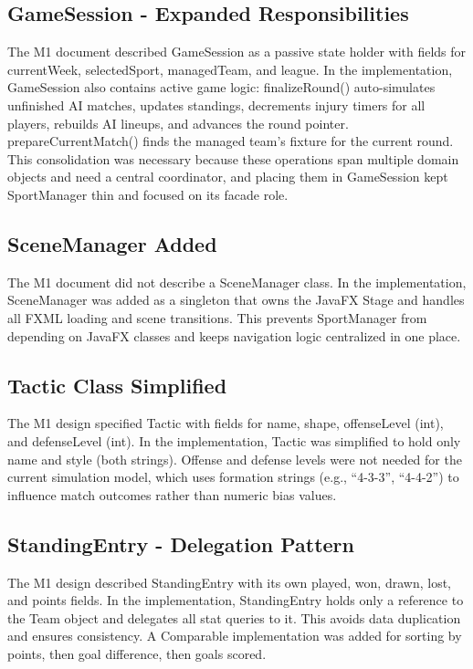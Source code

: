 \documentclass[11pt,a4paper]{article}
\begin{document}
\subsection{GameSession - Expanded Responsibilities}

The M1 document described GameSession as a passive state holder with fields for currentWeek, selectedSport, managedTeam, and league. In the implementation, GameSession also contains active game logic: finalizeRound() auto-simulates unfinished AI matches, updates standings, decrements injury timers for all players, rebuilds AI lineups, and advances the round pointer. prepareCurrentMatch() finds the managed team's fixture for the current round. This consolidation was necessary because these operations span multiple domain objects and need a central coordinator, and placing them in GameSession kept SportManager thin and focused on its facade role.

\subsection{SceneManager Added}

The M1 document did not describe a SceneManager class. In the implementation, SceneManager was added as a singleton that owns the JavaFX Stage and handles all FXML loading and scene transitions. This prevents SportManager from depending on JavaFX classes and keeps navigation logic centralized in one place.

\subsection{Tactic Class Simplified}

The M1 design specified Tactic with fields for name, shape, offenseLevel (int), and defenseLevel (int). In the implementation, Tactic was simplified to hold only name and style (both strings). Offense and defense levels were not needed for the current simulation model, which uses formation strings (e.g., ``4-3-3'', ``4-4-2'') to influence match outcomes rather than numeric bias values.

\subsection{StandingEntry - Delegation Pattern}

The M1 design described StandingEntry with its own played, won, drawn, lost, and points fields. In the implementation, StandingEntry holds only a reference to the Team object and delegates all stat queries to it. This avoids data duplication and ensures consistency. A Comparable implementation was added for sorting by points, then goal difference, then goals scored.
\end{document}
